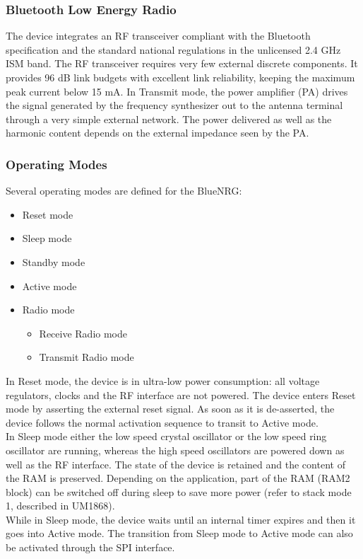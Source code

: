 \subsubsection{Bluetooth Low Energy Radio}
The device integrates an RF transceiver compliant with the Bluetooth specification and the standard national regulations in the unlicensed 2.4 GHz ISM band. The RF transceiver requires very few external discrete components. It provides 96 dB link budgets with excellent link reliability, keeping the maximum peak current below 15 mA. In Transmit mode, the power amplifier (PA) drives the signal generated by the frequency synthesizer out to the antenna terminal through a very simple external network. The power delivered as well as the harmonic content depends on the external impedance seen by the PA.
\subsubsection{Operating Modes}
Several operating modes are defined for the BlueNRG:
\begin{itemize}
	\item Reset mode
	\item Sleep mode 
	\item Standby mode 
	\item Active mode 
	\item Radio mode 
	\begin{itemize}
		\item Receive Radio mode 
		\item Transmit Radio mode
	\end{itemize}
\end{itemize}
In Reset mode, the device is in ultra-low power consumption: all voltage regulators, clocks and the RF interface are not powered. The device enters Reset mode by asserting the external reset signal. As soon as it is de-asserted, the device follows the normal activation sequence to transit to Active mode. \\
In Sleep mode either the low speed crystal oscillator or the low speed ring oscillator are running, whereas the high speed oscillators are powered down as well as the RF interface. The state of the device is retained and the content of the RAM is preserved. Depending on the application, part of the RAM (RAM2 block) can be switched off during sleep to save more power (refer to stack mode 1, described in UM1868). \\
While in Sleep mode, the device waits until an internal timer expires and then it goes into Active mode. The transition from Sleep mode to Active mode can also be activated through the SPI interface. \\
